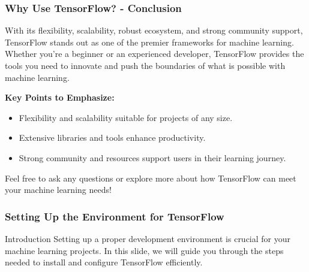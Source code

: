 \documentclass[aspectratio=169]{beamer}
\begin{document}
\begin{frame}[fragile]
    \frametitle{Why Use TensorFlow? - Conclusion}
    With its flexibility, scalability, robust ecosystem, and strong community support, TensorFlow stands out as one of the premier frameworks for machine learning. Whether you're a beginner or an experienced developer, TensorFlow provides the tools you need to innovate and push the boundaries of what is possible with machine learning.

    \textbf{Key Points to Emphasize:}
    \begin{itemize}
        \item Flexibility and scalability suitable for projects of any size.
        \item Extensive libraries and tools enhance productivity.
        \item Strong community and resources support users in their learning journey.
    \end{itemize}

    Feel free to ask any questions or explore more about how TensorFlow can meet your machine learning needs!
\end{frame}

\begin{frame}[fragile]
    \frametitle{Setting Up the Environment for TensorFlow}
    \begin{block}{Introduction}
        Setting up a proper development environment is crucial for your machine learning projects. 
        In this slide, we will guide you through the steps needed to install and configure TensorFlow efficiently.
    \end{block}
\end{frame}
\end{document}
